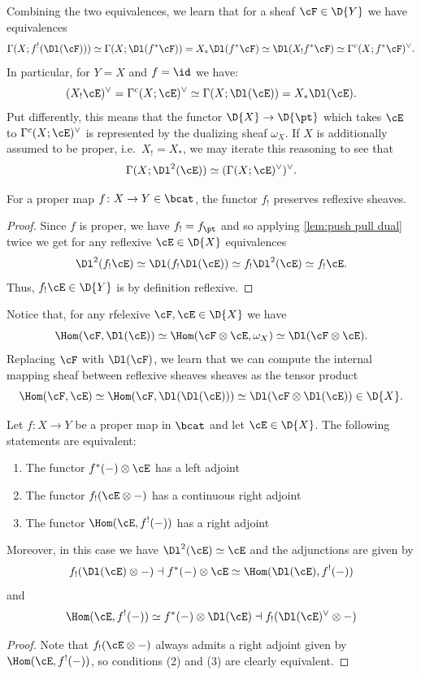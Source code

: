 Combining the two equivalences, we learn that for a sheaf $\cF\in \D{Y}$ we have
equivalences
\[ \Gamma(X; f^{!}(\Dl(\cF)))\simeq \Gamma(X;\Dl(f^{\ast}\cF))= X_{\ast} \Dl(f^{\ast}\cF) \simeq \Dl(X_{!}f^{\ast}\cF) \simeq \Gamma^{c}(X;f^{\ast}\cF)^{\vee}.\]
In particular, for $Y=X$ and $f=\id$ we have:
\[ (X_{!}\cE)^{\vee}=\Gamma^{c}(X;\cE)^{\vee} \simeq \Gamma(X;\Dl(\cE))=X_{\ast}\Dl(\cE).\] Put
differently, this means that the functor $\D{X} \to \D{\pt}$ which takes $\cE$ to
$\Gamma^{c}(X;\cE)^{\vee}$ is represented by the dualizing sheaf $\omega_{X}$. If $X$ is
additionally assumed to be proper, i.e.~$X_{!}=X_{\ast}$, we may iterate this
reasoning to see that
\[ \Gamma(X;\Dl^{2}(\cE)) \simeq (\Gamma(X;\cE)^{\vee})^{\vee}.\]
\begin{cor}\label{cor:coherent push}
  For a proper map $f\colon X\to Y\in \bcat$, the functor $f_{!}$ preserves reflexive
  sheaves.
\end{cor}
\begin{proof}
  Since $f$ is proper, we have $f_{!}=f_{\pt}$ and so applying \cref{lem:push pull dual} twice
  we get for any reflexive $\cE\in \D{X}$ equivalences
  \[ \Dl^{2}(f_{!}\cE) \simeq \Dl(f_{!}\Dl(\cE)) \simeq f_{!}\Dl^{2}(\cE) \simeq f_{!}\cE.\]
  Thus, $f_{!}\cE\in \D{Y}$ is by definition reflexive.
\end{proof}

Notice that, for any rfelexive $\cF,\cE\in \D{X}$ we have
\[\Hom(\cF, \Dl(\cE)) \simeq \Hom(\cF \otimes \cE, \omega_{X})
  \simeq \Dl(\cF \otimes \cE).\] Replacing $\cF$ with $\Dl(\cF)$, we learn that we can
compute the internal mapping sheaf between reflexive sheaves sheaves as the tensor
product
\[ \Hom(\cF, \cE) \simeq \Hom(\cF, \Dl(\Dl(\cE))) \simeq \Dl(\cF \otimes \Dl(\cE)) \in \D{X}.\]


\begin{lem}\label{lem:suave conditions}
  Let $f\colon X\to Y$ be a proper map in $\bcat$ and let $\cE\in \D{X}$. The
  following statements are equivalent:
  \begin{enumerate}
    \item The functor $f^{\ast}(-)\otimes \cE$ has a left adjoint
    \item The functor $f_{!}(\cE \otimes -)$ has a continuous right adjoint
    \item The functor $\Hom(\cE, f^{!}(-))$ has a right adjoint
  \end{enumerate}
  Moreover, in this case we have $\Dl^{2}(\cE)\simeq \cE$ and the adjunctions are
  given by
  \[ f_{!}(\Dl(\cE)\otimes - ) \dashv f^{\ast}(-)\otimes\cE \simeq \Hom(\Dl(\cE), f^{!}(-))\] and
  \[ \Hom(\cE, f^{!}(-)) \simeq f^{\ast}(-)\otimes \Dl(\cE) \dashv f_{!}(\Dl(\cE)^{\vee} \otimes - )\]
\end{lem}
\begin{proof}
  Note that $f_{!}(\cE\otimes -)$ always admits a right adjoint given by
  $\Hom(\cE, f^{!}(-))$, so conditions (2) and (3) are clearly equivalent.
\end{proof}

